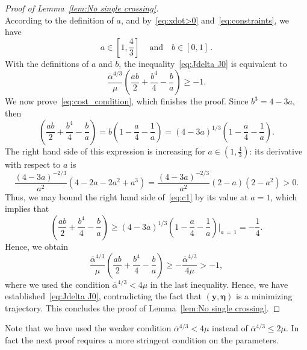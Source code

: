 \documentclass[10pt]{amsart}
\theoremstyle{definition}\newtheorem{defi}[theo]{Definition}\newtheorem{rema}[theo]{Remark}\newtheorem{exam}[theo]{Example}\newtheorem{exem}[theo]{Example}\newtheorem{nota}[theo]{Notation}
\newcommand{\by}{\mathbf{y}}
\newcommand{\beeta}{\boldsymbol{\eta}}
\newcommand{\1}{\mathds{1}}
\begin{document}
\begin{proof}[Proof of Lemma~\ref{lem:No single crossing}]
\begin{equation*}
\end{equation*}
According to the definition of $a$, and by~\eqref{eq:xdot>0} and~\eqref{eq:constraints}, we have
\[
a\in \left[1,\frac{4}{3}\right]\, \quad \text{and}\quad b\in [0,1]\,.
\]
With the definitions of $a$ and $b$, the inequality~\eqref{eq:Jdelta J0} is equivalent to
\begin{equation}\label{eq:cost_condition}
\frac{\overline \alpha^{4/3}}{\mu} \left (\dfrac{a b}{2} + \dfrac{b^4}{4} - \dfrac{b }{a}\right)\geq - 1.
\end{equation}
We now prove~\eqref{eq:cost_condition}, which finishes the proof. Since $b^3 = 4 - 3a$, then
\begin{equation}\label{eq:c1}
\left (\frac{a b}{2} + \frac{b^4}{4} - \frac{b }{a}\right) = b \left(1 - \frac{a}{4} - \frac{1}{a}\right) = (4 - 3a)^{1/3}\left(1 - \frac{a}{4} - \frac{1}{a}\right).
\end{equation}
The right hand side of this expression is increasing for $a\in (1,\frac43)$: its derivative with respect to $a$ is
\begin{equation*}
\frac{\left(4 - 3 a\right)^{-2/3}}{a^2}\left (4 - 2 a - 2 a^2 + a^3 \right) = \frac{\left (4 - 3 a\right)^{-2/3}}{a^2} (2-a)\left(2-a^2\right) > 0.
\end{equation*}
Thus, we may bound the right hand side of~\eqref{eq:c1} by its value at $a=1$, which implies that
\[
\left (\frac{a b}{2} + \frac{b^4}{4} - \frac{b }{a}\right)
\geq \left(4 - 3 a\right)^{1/3} \left(1 - \frac{a}{4} - \frac{1}{a}\right){\bigg|}_{a\,=\,1} = -\frac{1}{4}.
\]
Hence, we obtain
\[
\frac{\overline \alpha^{4/3}}{\mu}\left(\frac{a b}{2} + \frac{b^4}{4} - \frac{b }{a}\right)
\geq -\frac{\overline \alpha^{4/3}}{4\mu} > -1,
\]
where we used the condition $\overline\alpha^{4/3} < 4 \mu$ in the last inequality. Hence, we have established~\eqref{eq:Jdelta J0}, contradicting the fact that $(\by,\beeta)$ is a minimizing trajectory. This concludes the proof of Lemma~\ref{lem:No single crossing}.
\end{proof}

Note that we have used the weaker condition $\overline\alpha^{4/3} < 4 \mu$ instead of $\overline\alpha^{4/3} \leq 2 \mu$. In fact the next proof requires a more stringent condition on the parameters.
\end{document}
